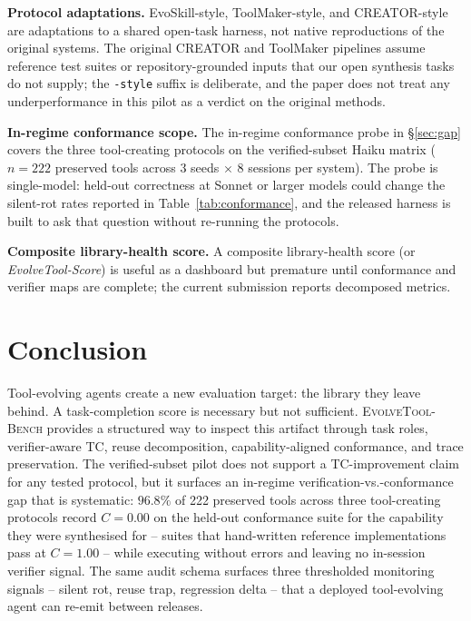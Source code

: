 \documentclass[sigconf,anonymous,natbib=false]{acmart}
\begin{document}
\textbf{Protocol adaptations.} EvoSkill-style, ToolMaker-style, and CREATOR-style are adaptations to a shared open-task harness, not native reproductions of the original systems. The original CREATOR and ToolMaker pipelines assume reference test suites or repository-grounded inputs that our open synthesis tasks do not supply; the \texttt{-style} suffix is deliberate, and the paper does not treat any underperformance in this pilot as a verdict on the original methods.

\textbf{In-regime conformance scope.} The in-regime conformance probe in \S\ref{sec:gap} covers the three tool-creating protocols on the verified-subset Haiku matrix ($n{=}222$ preserved tools across 3 seeds $\times$ 8 sessions per system). The probe is single-model: held-out correctness at Sonnet or larger models could change the silent-rot rates reported in Table~\ref{tab:conformance}, and the released harness is built to ask that question without re-running the protocols.

\textbf{Composite library-health score.} A composite library-health score (or \emph{EvolveTool-Score}) is useful as a dashboard but premature until conformance and verifier maps are complete; the current submission reports decomposed metrics.

\section{Conclusion}

Tool-evolving agents create a new evaluation target: the library they leave behind. A task-completion score is necessary but not sufficient. \textsc{EvolveTool-Bench} provides a structured way to inspect this artifact through task roles, verifier-aware TC, reuse decomposition, capability-aligned conformance, and trace preservation. The verified-subset pilot does not support a TC-improvement claim for any tested protocol, but it surfaces an in-regime verification-vs.-conformance gap that is systematic: $96.8\%$ of 222 preserved tools across three tool-creating protocols record $C{=}0.00$ on the held-out conformance suite for the capability they were synthesised for -- suites that hand-written reference implementations pass at $C{=}1.00$ -- while executing without errors and leaving no in-session verifier signal. The same audit schema surfaces three thresholded monitoring signals -- silent rot, reuse trap, regression delta -- that a deployed tool-evolving agent can re-emit between releases.
\end{document}
